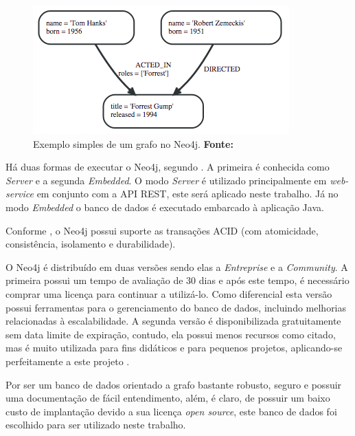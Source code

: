 \begin{figure}[h!]
	\centerline{\includegraphics[scale=0.8]{./imagens/simple_graph_neo4j.png}}
	\caption[Exemplo simples de um grafo no Neo4j]
	{Exemplo simples de um grafo no Neo4j. \textbf{Fonte:} }
	\label{fig:exemplo1}
\end{figure}

\par Há duas formas de executar o Neo4j, segundo . A primeira é conhecida como \textit{Server} e a segunda \textit{Embedded}. O modo \textit{Server} é utilizado principalmente em \textit{web-service} em conjunto com a API REST, este será aplicado neste trabalho. Já no modo \textit{Embedded} o banco de dados é executado embarcado à aplicação Java.

\par Conforme , o Neo4j possui suporte as transações ACID (com atomicidade, consistência, isolamento e durabilidade).

O Neo4j é distribuído em duas versões sendo elas a \textit{Entreprise} e a \textit{Community}. A primeira possui um tempo de avaliação de 30 dias e após este tempo, é necessário comprar uma licença para continuar a utilizá-lo. Como diferencial esta versão possui ferramentas para o gerenciamento do banco de dados, incluindo melhorias relacionadas à escalabilidade. A segunda versão é disponibilizada gratuitamente sem data limite de expiração, contudo, ela possui menos recursos como citado, mas é muito utilizada para fins didáticos e para pequenos projetos, aplicando-se perfeitamente a este projeto \cite{neo4j_team_manual}.

\par Por ser um banco de dados orientado a grafo bastante robusto, seguro e possuir uma documentação de fácil entendimento, além, é claro, de possuir um baixo custo de implantação devido a sua licença \textit{open source}, este banco de dados foi escolhido para ser utilizado neste trabalho.

